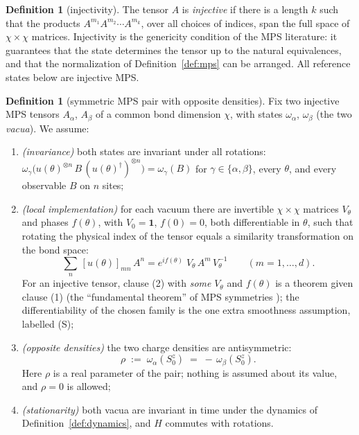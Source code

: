 \documentclass[11pt]{article}
\theoremstyle{definition}
\newtheorem{definition}[theorem]{Definition}
\theoremstyle{remark}
\begin{document}
\begin{definition}[injectivity]\label{def:injective}
The tensor $A$ is \emph{injective} if there is a length $k$ such that the
products $A^{m_1}A^{m_2}\cdots A^{m_k}$, over all choices of indices, span the
full space of $\chi\times\chi$ matrices.  Injectivity is the genericity
condition of the MPS literature: it guarantees that the state determines the
tensor up to the natural equivalences, and that the normalization of
Definition~\ref{def:mps} can be arranged.  All reference states below are
injective MPS.
\end{definition}

\begin{definition}[symmetric MPS pair with opposite densities]\label{def:vacua}
Fix two injective MPS tensors $A_\alpha$, $A_\beta$ of a common bond dimension
$\chi$, with states $\omega_\alpha$, $\omega_\beta$ (the two \emph{vacua}).
We assume:
\begin{enumerate}
\item \emph{(invariance)} both states are invariant under all rotations:
$\omega_\gamma\bigl(u(\theta)^{\otimes n}\,B\,(u(\theta)^{\dagger})^{\otimes n}\bigr)
=\omega_\gamma(B)$ for $\gamma\in\{\alpha,\beta\}$, every $\theta$, and every
observable $B$ on $n$ sites;
\item \emph{(local implementation)} for each vacuum there are invertible
$\chi\times\chi$ matrices $V_\theta$ and phases $f(\theta)$, with
$V_0=\mathbf{1}$, $f(0)=0$, both differentiable in $\theta$, such that
rotating the physical index of the tensor equals a similarity transformation
on the bond space:
\[
\sum_{n}\,[u(\theta)]_{mn}\,A^{n}
=e^{i f(\theta)}\;V_\theta\,A^{m}\,V_\theta^{-1}\qquad(m=1,\dots,d).
\]
For an injective tensor, clause (2) with \emph{some} $V_\theta$ and
$f(\theta)$ is a theorem given clause (1) (the ``fundamental theorem'' of MPS
symmetries \cite{perez2008,cirac2021}); the differentiability of the chosen
family is the one extra smoothness assumption, labelled (S);
\item \emph{(opposite densities)} the two charge densities are antisymmetric:
\[
\rho\;:=\;\omega_\alpha(S^z_0)\;=\;-\,\omega_\beta(S^z_0).
\]
Here $\rho$ is a real parameter of the pair; nothing is assumed about its
value, and $\rho=0$ is allowed;
\item \emph{(stationarity)} both vacua are invariant in time under the
dynamics of Definition~\ref{def:dynamics}, and $H$ commutes with rotations.
\end{enumerate}
\end{definition}
\end{document}
